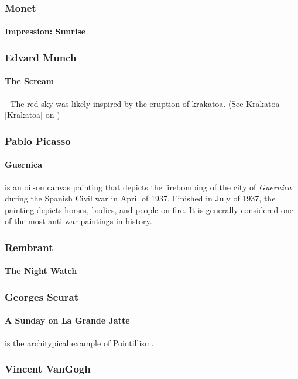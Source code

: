 			\subsubsection{Monet}
				\paragraph{Impression: Sunrise}
			\subsubsection{Edvard Munch} \label{EdwardMunchArt}
				\paragraph{The Scream} - The red sky was likely inspired by the eruption of krakatoa. (See Krakatoa - \ref{Krakatoa} on )
			\subsubsection{Pablo Picasso}
				\paragraph{Guernica} is an oil-on canvas painting that depicts the firebombing of the city of \textit{Guernica} during the Spanish Civil war in April of 1937.  Finished in July of 1937, the painting depicts horses, bodies, and people on fire.  It is generally considered one of the most anti-war paintings in history.
			\subsubsection{Rembrant}
				\paragraph{The Night Watch}

			\subsubsection{Georges Seurat}
				\paragraph{A Sunday on La Grande Jatte} is the architypical example of Pointillism. 
			\subsubsection{Vincent VanGogh}
